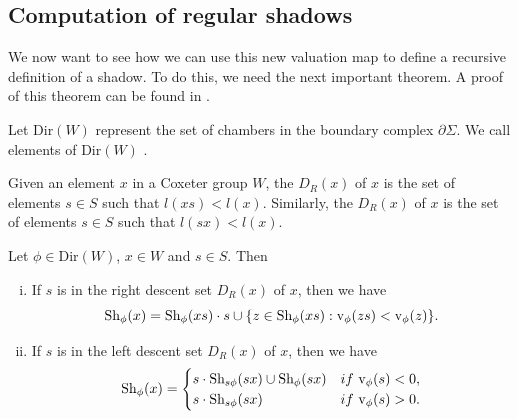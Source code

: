 \documentclass[11pt]{article}
\begin{document}
\subsection{Computation of regular shadows}

We now want to see how we can use this new valuation map to define a recursive definition of a shadow. To do this, we need the next important theorem. A proof of this theorem can be found in \cite[pp.142-143]{SHA}. 

Let Dir$(W)$ represent the set of chambers in the boundary complex $\partial\Sigma$. We call elements of Dir$(W)$ . 

\begin{definition}
    Given an element $x$ in a Coxeter group $W$, the  $D_R(x)$ of $x$ is the set of elements $s\in S$ such that $l(xs)<l(x)$. Similarly, the  $D_R(x)$ of $x$ is the set of elements $s\in S$ such that $l(sx)<l(x)$.
\end{definition}

\begin{theorem} \label{alg}
    Let $\phi\in$Dir$(W)$, $x\in W$ and $s\in S$. Then
    \begin{enumerate}[(i)]
        \item If $s$ is in the right descent set $D_R(x)$ of $x$, then we have
        \[\textnormal{Sh}_\phi(x)=\textnormal{Sh}_\phi(xs)\cdot s \cup \{z\in \textnormal{Sh}_\phi(xs):\textnormal{v}_\phi(zs)<\textnormal{v}_\phi(z)\}.\]
        \item If $s$ is in the left descent set $D_R(x)$ of $x$, then we have
        \[\textnormal{Sh}_\phi(x)=\begin{cases}
            s\cdot \textnormal{Sh}_{s\phi}(sx)\cup \textnormal{Sh}_\phi(sx) &if\textnormal{ v}_\phi(s)<0,\\
            s\cdot \textnormal{Sh}_{s\phi}(sx) &if \textnormal{ v}_\phi(s)>0.\\
        \end{cases}\]
    \end{enumerate}
\end{theorem}


\end{document}
